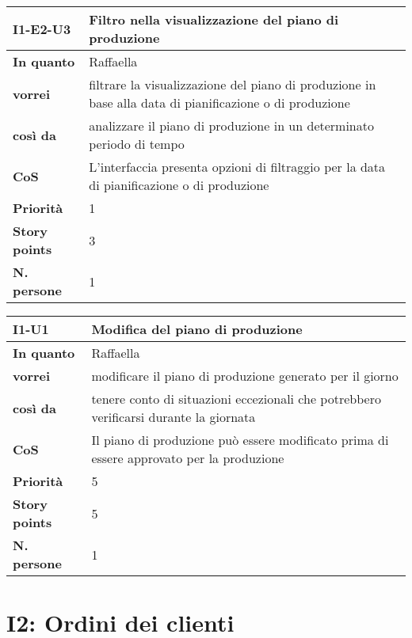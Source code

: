 \begin{table}[H]
  \begin{tabularx}{\textwidth}{lX}
    \toprule
    \textbf{I1-E2-U3} & \textbf{Filtro nella visualizzazione del piano di produzione} \\
    \midrule
    \textbf{In quanto} & Raffaella \\
    \textbf{vorrei} & filtrare la visualizzazione del piano di produzione in base alla data di pianificazione o di produzione \\
    \textbf{così da} & analizzare il piano di produzione in un determinato periodo di tempo \\
    \midrule
    \textbf{CoS} & L'interfaccia presenta opzioni di filtraggio per la data di pianificazione o di produzione \\
    \midrule
    \textbf{Priorità} & 1 \\
    \textbf{Story points} & 3 \\
    \textbf{N. persone} & 1 \\
    \bottomrule
  \end{tabularx}
  \label{user-story:i1-e2-u3}
\end{table}

\begin{table}[H]
  \begin{tabularx}{\textwidth}{lX}
    \toprule
    \textbf{I1-U1} & \textbf{Modifica del piano di produzione} \\
    \midrule
    \textbf{In quanto} & Raffaella \\
    \textbf{vorrei} & modificare il piano di produzione generato per il giorno \\
    \textbf{così da} & tenere conto di situazioni eccezionali che potrebbero verificarsi durante la giornata \\
    \midrule
    \textbf{CoS} & Il piano di produzione può essere modificato prima di essere approvato per la produzione \\
    \midrule
    \textbf{Priorità} & 5 \\
    \textbf{Story points} & 5 \\
    \textbf{N. persone} & 1 \\
    \bottomrule
  \end{tabularx}
  \label{user-story:i1-u1}
\end{table}

\section*{I2: Ordini dei clienti}

